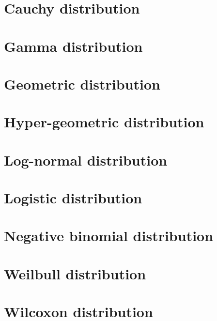 \section{Cauchy distribution}
\label{sec:cauchy-distribution}


\section{Gamma distribution}
\label{sec:gamma-distribution}

\section{Geometric distribution}
\label{sec:geom-distr}

\section{Hyper-geometric distribution}
\label{sec:hyper-geom-distr}

\section{Log-normal distribution}
\label{sec:log-norm-distr}

\section{Logistic distribution}
\label{sec:logist-distr}

\section{Negative binomial distribution}
\label{sec:negat-binom-distr}

\section{Weilbull distribution}
\label{sec:weilb-distr}

\section{Wilcoxon distribution}
\label{sec:wilc-}


